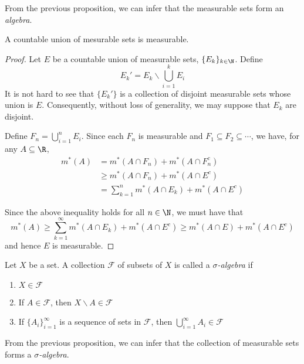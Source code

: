 From the previous proposition, we can infer that the measurable sets form an \textit{algebra}.

\begin{proposition}
    A countable union of mesurable sets is measurable.
\end{proposition}
\begin{proof}
    Let $E$ be a countable union of measurable sets, $\{E_k\}_{k\in\N}$. Define 
    \begin{equation*}
        E_k'= E_k\backslash\bigcup_{i = 1}^k E_i
    \end{equation*}
    It is not hard to see that $\{E_k'\}$ is a collection of disjoint measurable sets whose union is $E$. Consequently, without loss of generality, we may suppose that $E_k$ are disjoint. 

    Define $F_n = \bigcup\limits_{i = 1}^n E_i$. Since each $F_n$ is measurable and $F_1\subseteq F_2\subseteq\cdots$, we have, for any $A\subseteq\R$,
    \begin{align*}
        m^*(A) &= m^*(A\cap F_n) + m^*(A\cap F_n^c)\\
        &\ge m^*(A\cap F_n) + m^*(A\cap E^c)\\
        &= \sum_{k = 1}^n m^*(A\cap E_k) + m^*(A\cap E^c)
    \end{align*}

    Since the above inequality holds for all $n\in\N$, we must have that 
    \begin{equation*}
        m^*(A)\ge\sum_{k = 1}^\infty m^*(A\cap E_k) + m^*(A\cap E^c)\ge m^*(A\cap E) + m^*(A\cap E^c)
    \end{equation*}
    and hence $E$ is measurable.
\end{proof}

\begin{definition}
    Let $X$ be a set. A collection $\mathcal F$ of subsets of $X$ is called a \textit{$\sigma$-algebra} if 
    \begin{enumerate}[label=(\alph*)]
        \item $X\in\mathcal F$ 
        \item If $A\in\mathcal F$, then $X\backslash A\in\mathcal F$
        \item If $\{A_i\}_{i = 1}^\infty$ is a sequence of sets in $\mathcal F$, then $\bigcup\limits_{i = 1}^\infty A_i\in\mathcal F$
    \end{enumerate}
\end{definition}

From the previous proposition, we can infer that the collection of measurable sets forms a \textit{$\sigma$-algebra}.

